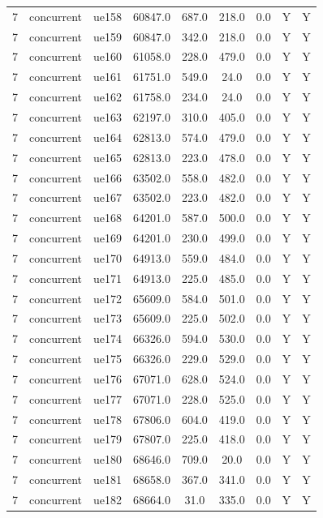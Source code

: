 \begin{table}[ht]
\begin{tabular}{|c|c|c|c|c|c|c|c|c|}
7 & concurrent & ue158 & 60847.0 & 687.0 & 218.0 & 0.0 & Y & Y \\
7 & concurrent & ue159 & 60847.0 & 342.0 & 218.0 & 0.0 & Y & Y \\
7 & concurrent & ue160 & 61058.0 & 228.0 & 479.0 & 0.0 & Y & Y \\
7 & concurrent & ue161 & 61751.0 & 549.0 & 24.0 & 0.0 & Y & Y \\
7 & concurrent & ue162 & 61758.0 & 234.0 & 24.0 & 0.0 & Y & Y \\
7 & concurrent & ue163 & 62197.0 & 310.0 & 405.0 & 0.0 & Y & Y \\
7 & concurrent & ue164 & 62813.0 & 574.0 & 479.0 & 0.0 & Y & Y \\
7 & concurrent & ue165 & 62813.0 & 223.0 & 478.0 & 0.0 & Y & Y \\
7 & concurrent & ue166 & 63502.0 & 558.0 & 482.0 & 0.0 & Y & Y \\
7 & concurrent & ue167 & 63502.0 & 223.0 & 482.0 & 0.0 & Y & Y \\
7 & concurrent & ue168 & 64201.0 & 587.0 & 500.0 & 0.0 & Y & Y \\
7 & concurrent & ue169 & 64201.0 & 230.0 & 499.0 & 0.0 & Y & Y \\
7 & concurrent & ue170 & 64913.0 & 559.0 & 484.0 & 0.0 & Y & Y \\
7 & concurrent & ue171 & 64913.0 & 225.0 & 485.0 & 0.0 & Y & Y \\
7 & concurrent & ue172 & 65609.0 & 584.0 & 501.0 & 0.0 & Y & Y \\
7 & concurrent & ue173 & 65609.0 & 225.0 & 502.0 & 0.0 & Y & Y \\
7 & concurrent & ue174 & 66326.0 & 594.0 & 530.0 & 0.0 & Y & Y \\
7 & concurrent & ue175 & 66326.0 & 229.0 & 529.0 & 0.0 & Y & Y \\
7 & concurrent & ue176 & 67071.0 & 628.0 & 524.0 & 0.0 & Y & Y \\
7 & concurrent & ue177 & 67071.0 & 228.0 & 525.0 & 0.0 & Y & Y \\
7 & concurrent & ue178 & 67806.0 & 604.0 & 419.0 & 0.0 & Y & Y \\
7 & concurrent & ue179 & 67807.0 & 225.0 & 418.0 & 0.0 & Y & Y \\
7 & concurrent & ue180 & 68646.0 & 709.0 & 20.0 & 0.0 & Y & Y \\
7 & concurrent & ue181 & 68658.0 & 367.0 & 341.0 & 0.0 & Y & Y \\
7 & concurrent & ue182 & 68664.0 & 31.0 & 335.0 & 0.0 & Y & Y \\

\end{tabular}
\end{table}
